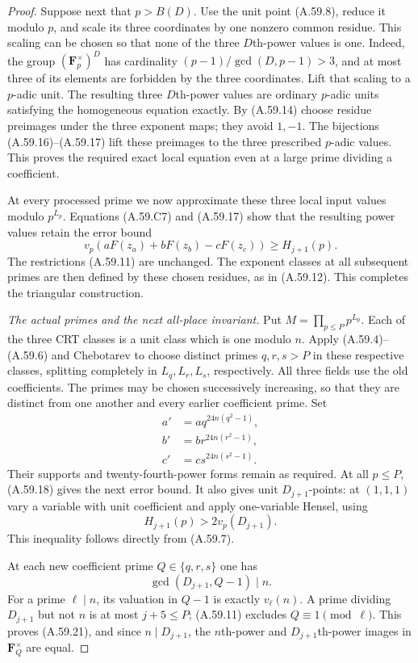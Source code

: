 \begin{proof}
Suppose next that $p>B(D)$.
Use the unit point (A.59.8), reduce it modulo
$p$, and scale its three coordinates by one
nonzero common residue. This scaling can be
chosen so that none of the three $D$th-power
values is one. Indeed, the group
$(\mathbf F_p^\times)^D$ has cardinality
$(p-1)/\gcd(D,p-1)>3$, and at most three
of its elements are forbidden by the three
coordinates. Lift that scaling to a $p$-adic
unit. The resulting three $D$th-power values
are ordinary $p$-adic units satisfying the
homogeneous equation exactly.
By (A.59.14) choose residue preimages under
the three exponent maps; they avoid $1,-1$.
The bijections (A.59.16)--(A.59.17) lift these
preimages to the three prescribed $p$-adic
values. This proves the required exact local
equation even at a large prime dividing a
coefficient.

At every processed prime we now approximate
these three local input values modulo
$p^{L_p}$. Equations (A.59.C7) and (A.59.17)
show that the resulting power values retain
the error bound
\[
                    v_p(aF(z_a)+bF(z_b)-cF(z_c))
                                      \ge H_{j+1}(p).
 \tag{A.59.18}
\]
The restrictions (A.59.11) are unchanged.
The exponent classes at all subsequent primes
are then defined by these chosen residues,
as in (A.59.12). This completes the triangular
construction.

\emph{The actual primes and the next all-place invariant.}
Put $M=\prod_{p\le P}p^{L_p}$.
Each of the three CRT classes is a unit class
which is one modulo $n$.
Apply (A.59.4)--(A.59.6) and Chebotarev to
choose distinct primes $q,r,s>P$ in these
respective classes, splitting completely in
$L_q,L_r,L_s$, respectively.
All three fields use the old coefficients.
The primes may be chosen successively increasing,
so that they are distinct from one another
and every earlier coefficient prime.
Set
\[
 \begin{split}
 a'&=a q^{24n(q^2-1)},\\
 b'&=b r^{24n(r^2-1)},\\
 c'&=c s^{24n(s^2-1)}.
 \end{split}
 \tag{A.59.19}
\]
Their supports and twenty-fourth-power forms
remain as required. At all $p\le P$,
(A.59.18) gives the next error bound.
It also gives unit $D_{j+1}$-points:
at $(1,1,1)$ vary a variable with unit
coefficient and apply one-variable Hensel,
using
\[
              H_{j+1}(p)>2v_p(D_{j+1}).
 \tag{A.59.20}
\]
This inequality follows directly from (A.59.7).

At each new coefficient prime $Q\in\{q,r,s\}$
one has
\[
                  \gcd(D_{j+1},Q-1)\mid n.
 \tag{A.59.21}
\]
For a prime $\ell\mid n$, its valuation in
$Q-1$ is exactly $v_\ell(n)$.
A prime dividing $D_{j+1}$ but not $n$
is at most $j+5\le P$; (A.59.11) excludes
$Q\equiv1\pmod\ell$.
This proves (A.59.21), and since $n\mid D_{j+1}$,
the $n$th-power and $D_{j+1}$th-power images
in $\mathbf F_Q^\times$ are equal.


\end{proof}
